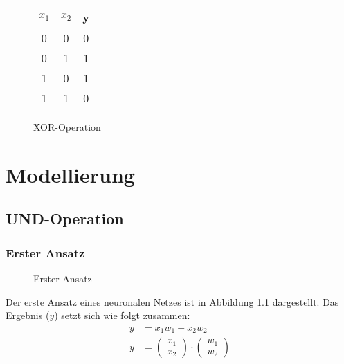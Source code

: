 \documentclass[a4paper]{report}
\begin{document}
\begin{figure}[ht]
    \centering
    \begin{tabular}{|c|c|c|}
        \hline
        $x_1$ & $x_2$ & y \\
        \hline
        0 & 0 & 0 \\
        \hline
        0 & 1 & 1 \\
        \hline
        1 & 0 & 1 \\
        \hline
        1 & 1 & 0 \\
        \hline
    \end{tabular}
    \caption{XOR-Operation}
\end{figure}

\chapter{Modellierung}
\section{UND-Operation}
\subsection{Erster Ansatz}
\begin{figure}[ht]
    \centering
    \caption{Erster Ansatz}
    \label{fig:net0}
\end{figure}

Der erste Ansatz eines neuronalen Netzes ist in Abbildung \ref{fig:net0} dargestellt.
Das Ergebnis ($y$) setzt sich wie folgt zusammen:
\begin{align}
    y&=x_1w_1+x_2w_2 \\
    y&=\begin{pmatrix} x_1 \\ x_2 \end{pmatrix}\cdot\begin{pmatrix} w_1 \\ w_2 \end{pmatrix}
\end{align}
\end{document}
